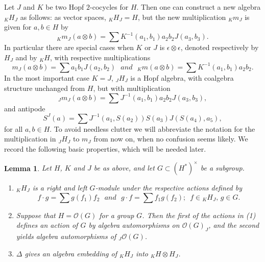 \documentclass{amsart}
\numberwithin{equation}{section}
\newtheorem{lemma}[theorem]{Lemma}
\theoremstyle{definition}
\begin{document}
Let $J$ and $K$ be two Hopf $2$-cocycles for $H$. Then one can construct a new algebra $_K H_J$ as follows: as vector spaces, $_K H_J = H$, but the new multiplication $_K m_J$ is given for $a,b \in H$ by
\begin{equation}\label{mult0} _K m_J(a\otimes b)=\sum K^{-1}(a_1,b_1)a_2b_2 J(a_3,b_3).
\end{equation}
In particular there are special cases when $K$ or $J$ is $\epsilon \otimes \epsilon$, denoted respectively by $H_J$ and by $_K H$, with respective multiplications
\begin{equation}\label{mult1} m_J(a\otimes b)  =  \sum a_1b_1 J(a_2,b_2)\,\, \textit{  and  }\,\, _K m(a\otimes b)  =  \sum K^{-1}(a_1,b_1)a_2b_2.
\end{equation}
In the most important case $K = J$, $_J H_J$ is a Hopf algebra, with coalgebra structure unchanged from $H$, but with multiplication
\begin{equation}\label{mult} {}_J m_J(a\otimes b)= \sum J^{-1}(a_1,b_1)a_2b_2 J(a_3,b_3),
\end{equation}
and antipode
\begin{equation}\label{twistanti}  S^J (a)=\sum J^{-1}(a_1,S(a_2))S(a_3)J(S(a_4),a_5),
\end{equation}
for all $a,b \in H$. To avoid needless clutter we will abbreviate the notation for the multiplication in ${}_JH_J$ to $m_J$ from now on, when no confusion seems likely. We record the following basic properties, which will be needed later. 

\begin{lemma}\label{action0} Let $H$, $K$ and $J$ be as above, and let $G\subset (H^*)^{\times}$ be a subgroup.
\begin{enumerate}
\item ${}_K H_J$ is a right and left $G$-module under the respective actions defined by 
\begin{equation}\label{action}   
f\cdot g = \sum g(f_1)f_2\,\, \textit{   and   }\,\, g\cdot f  = \sum f_1 g(f_2);\,\,\,f\in {}_K H_J,\, g \in G.
\end{equation}
\item Suppose that $H = \mathcal{O}(G)$ for a group $G$. Then the first of the actions in (1) defines an action of $G$ by algebra automorphisms on $\mathcal{O}(G)_J$, and the second yields algebra automorphisms of ${}_J\mathcal{O}(G)$.
\item $\Delta$ gives an algebra embedding of $_KH_J$ into ${}_K H \otimes H_J$.
\end{enumerate}
\end{lemma}
\end{document}
